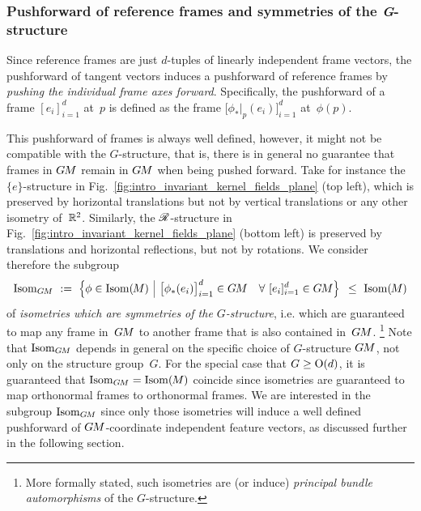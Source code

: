 \subsubsection{Pushforward of reference frames and symmetries of the \textit{G}-structure}

Since reference frames are just $d$-tuples of linearly independent frame vectors, the pushforward of tangent vectors induces a pushforward of reference frames by \emph{pushing the individual frame axes forward}.
Specifically, the pushforward of a frame $[e_i]_{i=1}^d$ at~$p$ is defined as the frame $\big[ \phi_*|_p (e_i) \big]_{i=1}^d$ at~$\phi(p)$.


This pushforward of frames is always well defined, however, it might not be compatible with the $G$-structure, that is, there is in general no guarantee that frames in $G\mkern-1.4muM$ remain in $G\mkern-1.4muM$ when being pushed forward.
Take for instance the $\{e\}$-structure in Fig.~\ref{fig:intro_invariant_kernel_fields_plane} (top left), which is preserved by horizontal translations but not by vertical translations or any other isometry of~$\mathbb{R}^2$.
Similarly, the $\mathscr{R}$-structure in Fig.~\ref{fig:intro_invariant_kernel_fields_plane} (bottom left) is preserved by translations and horizontal reflections, but not by rotations.
We consider therefore the subgroup
\begin{align}\label{eq:IsomGM_def_24}
    \IsomGM\ :=\ \pig\{ \phi \in \IsomM \ \pig|\ 
    \big[\phi_*(e_i)\big]_{i=1}^d \in \GM \quad \forall\ [e_i]_{i=1}^d \in \GM \pig\} \,\ \leq\ \IsomM
\end{align}
of \emph{isometries which are symmetries of the $G$-structure}, i.e. which are guaranteed to map any frame in~$G\mkern-1.4muM$ to another frame that is also contained in~$G\mkern-1.4muM$.%
\footnote{
    More formally stated, such isometries are (or induce) \emph{principal bundle automorphisms} of the $G$-structure.
}
Note that $\operatorname{Isom}_{G\mkern-1.4muM}$ depends in general on the specific choice of $G$-structure $G\mkern-1.4muM$, not only on the structure group~$G$.
For the special case that $G\geq\operatorname{O}(d)$, it is guaranteed that $\operatorname{Isom}_{G\mkern-1.4muM}=\operatorname{Isom}(\mkern-1.5mu M \mkern-.5mu)$ coincide since isometries are guaranteed to map orthonormal frames to orthonormal frames.
We are interested in the subgroup $\operatorname{Isom}_{G\mkern-1.4muM}$ since only those isometries will induce a well defined pushforward of $G\mkern-1.4muM$-coordinate independent feature vectors, as discussed further in the following section.


